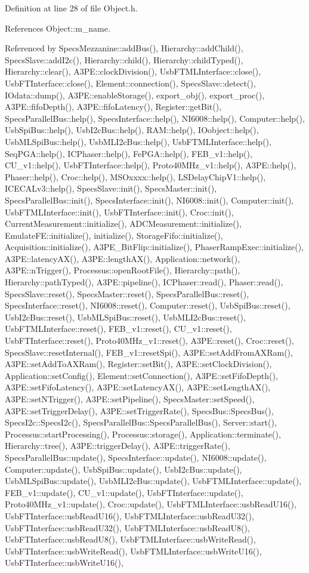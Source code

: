 Definition at line 28 of file Object.h.

References Object::m\_\-name.

Referenced by SpecsMezzanine::addBus(), Hierarchy::addChild(), SpecsSlave::addI2c(), Hierarchy::child(), Hierarchy::childTyped(), Hierarchy::clear(), A3PE::clockDivision(), UsbFTMLInterface::close(), UsbFTInterface::close(), Element::connection(), SpecsSlave::detect(), IOdata::dump(), A3PE::enableStorage(), export\_\-obj(), export\_\-proc(), A3PE::fifoDepth(), A3PE::fifoLatency(), Register::getBit(), SpecsParallelBus::help(), SpecsInterface::help(), NI6008::help(), Computer::help(), UsbSpiBus::help(), UsbI2cBus::help(), RAM::help(), IOobject::help(), UsbMLSpiBus::help(), UsbMLI2cBus::help(), UsbFTMLInterface::help(), SeqPGA::help(), ICPhaser::help(), FePGA::help(), FEB\_\-v1::help(), CU\_\-v1::help(), UsbFTInterface::help(), Proto40MHz\_\-v1::help(), A3PE::help(), Phaser::help(), Croc::help(), MSOxxxx::help(), LSDelayChipV1::help(), ICECALv3::help(), SpecsSlave::init(), SpecsMaster::init(), SpecsParallelBus::init(), SpecsInterface::init(), NI6008::init(), Computer::init(), UsbFTMLInterface::init(), UsbFTInterface::init(), Croc::init(), CurrentMeasurement::initialize(), ADCMeasurement::initialize(), EmulateFE::initialize(), initialize(), StorageFifo::initialize(), Acquisition::initialize(), A3PE\_\-BitFlip::initialize(), PhaserRampExec::initialize(), A3PE::latencyAX(), A3PE::lengthAX(), Application::network(), A3PE::nTrigger(), Processus::openRootFile(), Hierarchy::path(), Hierarchy::pathTyped(), A3PE::pipeline(), ICPhaser::read(), Phaser::read(), SpecsSlave::reset(), SpecsMaster::reset(), SpecsParallelBus::reset(), SpecsInterface::reset(), NI6008::reset(), Computer::reset(), UsbSpiBus::reset(), UsbI2cBus::reset(), UsbMLSpiBus::reset(), UsbMLI2cBus::reset(), UsbFTMLInterface::reset(), FEB\_\-v1::reset(), CU\_\-v1::reset(), UsbFTInterface::reset(), Proto40MHz\_\-v1::reset(), A3PE::reset(), Croc::reset(), SpecsSlave::resetInternal(), FEB\_\-v1::resetSpi(), A3PE::setAddFromAXRam(), A3PE::setAddToAXRam(), Register::setBit(), A3PE::setClockDivision(), Application::setConfig(), Element::setConnection(), A3PE::setFifoDepth(), A3PE::setFifoLatency(), A3PE::setLatencyAX(), A3PE::setLengthAX(), A3PE::setNTrigger(), A3PE::setPipeline(), SpecsMaster::setSpeed(), A3PE::setTriggerDelay(), A3PE::setTriggerRate(), SpecsBus::SpecsBus(), SpecsI2c::SpecsI2c(), SpecsParallelBus::SpecsParallelBus(), Server::start(), Processus::startProcessing(), Processus::storage(), Application::terminate(), Hierarchy::tree(), A3PE::triggerDelay(), A3PE::triggerRate(), SpecsParallelBus::update(), SpecsInterface::update(), NI6008::update(), Computer::update(), UsbSpiBus::update(), UsbI2cBus::update(), UsbMLSpiBus::update(), UsbMLI2cBus::update(), UsbFTMLInterface::update(), FEB\_\-v1::update(), CU\_\-v1::update(), UsbFTInterface::update(), Proto40MHz\_\-v1::update(), Croc::update(), UsbFTMLInterface::usbReadU16(), UsbFTInterface::usbReadU16(), UsbFTMLInterface::usbReadU32(), UsbFTInterface::usbReadU32(), UsbFTMLInterface::usbReadU8(), UsbFTInterface::usbReadU8(), UsbFTMLInterface::usbWriteRead(), UsbFTInterface::usbWriteRead(), UsbFTMLInterface::usbWriteU16(), UsbFTInterface::usbWriteU16(), 